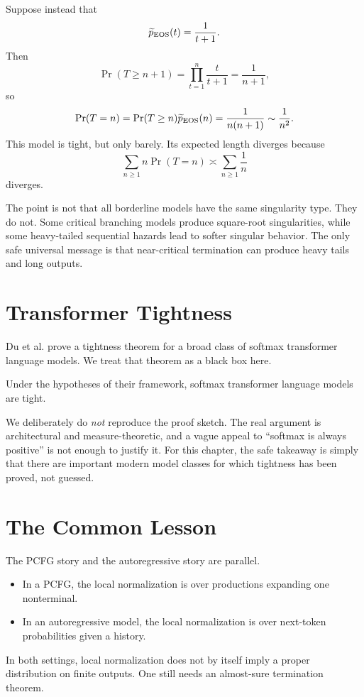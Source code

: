 \begin{example}
Suppose instead that
\[
  \widetilde p_{\operatorname{EOS}}(t) = \frac{1}{t+1}.
\]
Then
\[
  \Pr(T \ge n+1) = \prod_{t=1}^{n} \frac{t}{t+1} = \frac{1}{n+1},
\]
so
\[
  \Pr(T=n) = \Pr(T \ge n)\widetilde p_{\operatorname{EOS}}(n) = \frac{1}{n(n+1)} \sim \frac{1}{n^2}.
\]
This model is tight, but only barely. Its expected length diverges because
\[
  \sum_{n \ge 1} n\Pr(T=n) \asymp \sum_{n \ge 1} \frac{1}{n}
\]
diverges.
\end{example}

The point is not that all borderline models have the same singularity type. They do not. Some critical branching models produce square-root singularities, while some heavy-tailed sequential hazards lead to softer singular behavior. The only safe universal message is that near-critical termination can produce heavy tails and long outputs.

\section{Transformer Tightness}

Du et al.
prove a tightness theorem for a broad class of softmax transformer language models. We treat that theorem as a black box here.

\begin{theorem}
Under the hypotheses of their framework, softmax transformer language models are tight.
\end{theorem}

We deliberately do \emph{not} reproduce the proof sketch. The real argument is architectural and measure-theoretic, and a vague appeal to ``softmax is always positive'' is not enough to justify it. For this chapter, the safe takeaway is simply that there are important modern model classes for which tightness has been proved, not guessed.

\section{The Common Lesson}

The PCFG story and the autoregressive story are parallel.
\begin{itemize}
  \item In a PCFG, the local normalization is over productions expanding one nonterminal.
  \item In an autoregressive model, the local normalization is over next-token probabilities given a history.
\end{itemize}
In both settings, local normalization does not by itself imply a proper distribution on finite outputs. One still needs an almost-sure termination theorem.

